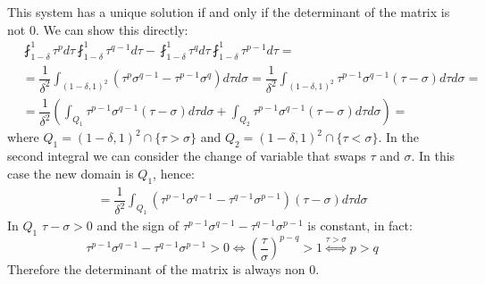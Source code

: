 \documentclass[corpo=11pt, stile=classica, tipotesi=custom,
greek, evenboxes, english]{toptesi}
\numberwithin{equation}{chapter}
\begin{document}
This system has a unique solution if and only if the determinant of the matrix is not 0. We can show this directly:
\begin{align*}
	& \fint_{1-\delta}^1 \tau^{p} d\tau \fint_{1-\delta}^1 \tau^{q-1} d\tau - \fint_{1-\delta}^1 \tau^{q} d\tau \fint_{1-\delta}^1 \tau^{p-1} d\tau=\\
	&= \dfrac{1}{\delta^2} \int_{(1-\delta,1)^2} \left(\tau^p \sigma^{q-1} - \tau^{p-1}\sigma^q\right) d\tau d\sigma = \dfrac{1}{\delta^2} \int_{(1-\delta,1)^2} \tau^{p-1} \sigma^{q-1} \left( \tau - \sigma \right) d\tau d\sigma = \\
	&= \dfrac{1}{\delta^2} \left( \int_{Q_1} \tau^{p-1} \sigma^{q-1} \left( \tau - \sigma \right) d\tau d\sigma + \int_{Q_2} \tau^{p-1} \sigma^{q-1} \left( \tau - \sigma \right) d\tau d\sigma \right)=
\end{align*}
where $Q_1=(1-\delta,1)^2 \cap \{\tau > \sigma\}$ and $Q_2=(1-\delta,1)^2 \cap \{\tau < \sigma\}$. In the second integral we can consider the change of variable that swaps $\tau$ and $\sigma$. In this case the new domain is $Q_1$, hence:
\begin{align*}
	= \dfrac{1}{\delta^2} \int_{Q_1} \left(\tau^{p-1}\sigma^{q-1} - \tau^{q-1}\sigma^{p-1}\right) \left(\tau - \sigma\right) d\tau d\sigma
\end{align*}
In $Q_1$ $\tau - \sigma > 0$ and the sign of $\tau^{p-1}\sigma^{q-1} - \tau^{q-1}\sigma^{p-1}$ is constant, in fact:
\begin{equation*}
	\tau^{p-1}\sigma^{q-1} - \tau^{q-1}\sigma^{p-1} > 0 \iff \left(\dfrac{\tau}{\sigma}\right)^{p-q} > 1 \overset{\tau > \sigma}{\iff} p>q
\end{equation*}
Therefore the determinant of the matrix is always non 0.\\
\end{document}
